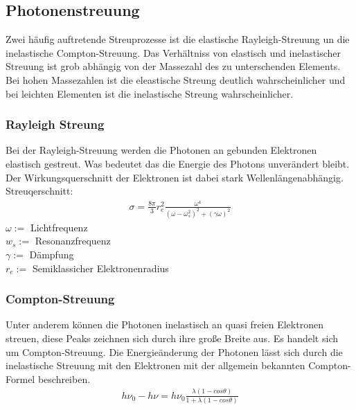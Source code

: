 \subsection{Photonenstreuung}
Zwei häufig auftretende Streuprozesse ist die elastische  Rayleigh-Streuung un die inelastische Compton-Streuung.  
Das Verhältniss von elastisch und inelastischer Streuung ist grob abhängig von der Massezahl des zu unterschenden Elements. Bei hohen Massezahlen ist die eleastische Streung deutlich wahrscheinlicher und bei leichten Elementen ist die inelastische Streung wahrscheinlicher. 
\subsubsection{Rayleigh Streung}
Bei der Rayleigh-Streuung werden die Photonen an gebunden Elektronen elastisch gestreut. Was bedeutet das die Energie des Photons unverändert bleibt.\\
Der Wirkungsquerschnitt der Elektronen ist dabei stark Wellenlängenabhängig.\\
Streuqerschnitt:\\
\begin{align}
    \sigma = \frac{8 \pi }{3}r_{e}^2 \frac{\omega^4}{(\omega -\omega_{s}^2)^2+(\gamma \omega)^2}
\end{align}
$\omega :=$ Lichtfrequenz \\
$w_{s} :=$ Resonanzfrequenz \\
$\gamma :=$ Dämpfung \\
$r_{e} :=$ Semiklassicher Elektronenradius \\
\subsubsection{Compton-Streuung}
Unter anderem können die Photonen inelastisch an quasi freien Elektronen streuen, diese Peaks zeichnen sich durch ihre große Breite aus. Es handelt sich um Compton-Streuung.
Die Energieänderung der Photonen lässt sich durch die inelastische Streuung mit den Elektronen mit der allgemein bekannten Compton-Formel beschreiben.
\begin{align}
\label{eq:Compton}
h\nu_{0}-h\nu = h \nu_{0} \frac{\lambda(1-cos\theta)}{1+ \lambda(1-cos \theta)}
\end{align}

